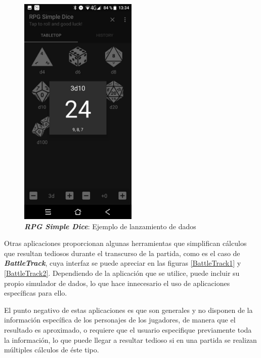 \begin{figure}[H]
\begin{minipage}{0.35\textwidth}
        \includegraphics[width=0.5\textwidth]{Images/RPG_Simple_Dice_2.jpeg}
        \caption{\textit{\textbf{RPG Simple Dice}}: Ejemplo de lanzamiento de 
        dados}
        \label{SimpleDice2}        
    \end{minipage}
\end{figure}

Otras aplicaciones proporcionan algunas herramientas que simplifican 
cálculos que resultan tediosos durante el transcurso de la partida, como 
es el caso de \textit{\textbf{BattleTrack}}, cuya interfaz se puede apreciar 
en las figuras \ref*{BattleTrack1} y \ref*{BattleTrack2}. Dependiendo de la aplicación 
que se utilice, puede incluir su propio simulador de dados, lo que hace 
innecesario el uso de aplicaciones específicas para ello. \medskip

El punto negativo de estas aplicaciones es que son generales y no disponen de 
la información específica de los personajes de los jugadores, de manera que 
el resultado es aproximado, o requiere que el usuario especifique previamente 
toda la información, lo que puede llegar a resultar tedioso si en una partida 
se realizan múltiples cálculos de éste tipo. 


